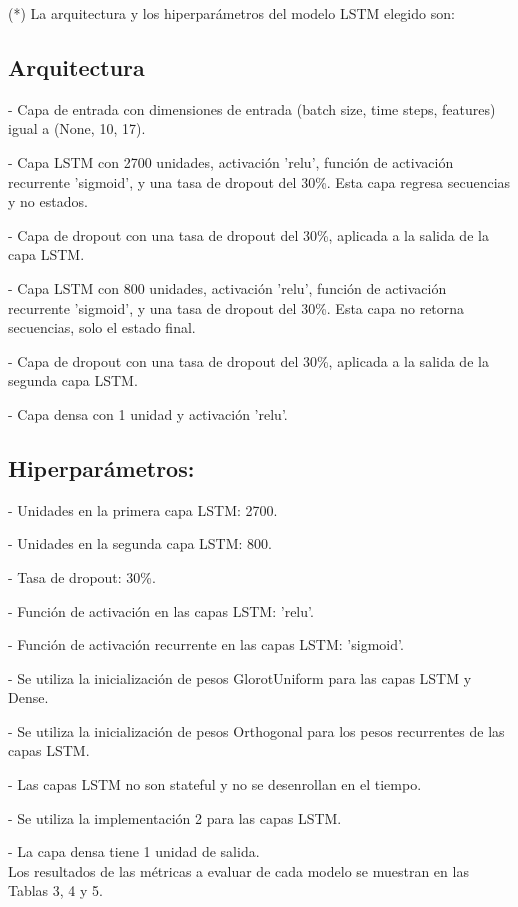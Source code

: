 \documentclass[twoside,11pt]{article}
\begin{document}
(*) La arquitectura y los hiperparámetros del modelo LSTM elegido son:

\subsection{Arquitectura}

- Capa de entrada con dimensiones de entrada (batch size, time steps, features) igual a (None, 10, 17).

- Capa LSTM con 2700 unidades, activación 'relu', función de activación recurrente 'sigmoid', y una tasa de dropout del 30\%. Esta capa regresa secuencias y no estados.

- Capa de dropout con una tasa de dropout del 30\%, aplicada a la salida de la capa LSTM.

- Capa LSTM con 800 unidades, activación 'relu', función de activación recurrente 'sigmoid', y una tasa de dropout del 30\%. Esta capa no retorna secuencias, solo el estado final.

- Capa de dropout con una tasa de dropout del 30\%, aplicada a la salida de la segunda capa LSTM.

- Capa densa con 1 unidad y activación 'relu'.

\subsection{Hiperparámetros:}

- Unidades en la primera capa LSTM: 2700.

- Unidades en la segunda capa LSTM: 800.

- Tasa de dropout: 30\%.

- Función de activación en las capas LSTM: 'relu'.

- Función de activación recurrente en las capas LSTM: 'sigmoid'.

- Se utiliza la inicialización de pesos GlorotUniform para las capas LSTM y Dense.

- Se utiliza la inicialización de pesos Orthogonal para los pesos recurrentes de las capas LSTM.

- Las capas LSTM no son stateful y no se desenrollan en el tiempo.

- Se utiliza la implementación 2 para las capas LSTM.

- La capa densa tiene 1 unidad de salida.\\

Los resultados de las métricas a evaluar de cada modelo se muestran en las Tablas 3, 4 y 5.
\end{document}
